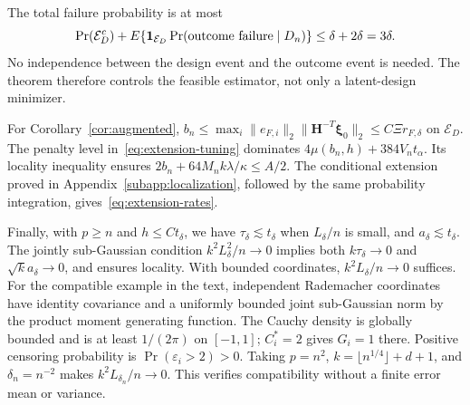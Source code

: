 The total failure probability is at most
\[
 \Pr(\mathcal E_D^c)
    +E\{\mathbf1_{\mathcal E_D}\Pr(\text{outcome failure}\mid\mathcal \bm{D}_n)\}
 \le\delta+2\delta=3\delta.
\]
No independence between the design event and the outcome event is needed. The theorem therefore controls the feasible estimator, not only a latent-design minimizer.

For Corollary~\ref{cor:augmented}, $b_n\le\max_i\|e_{F,i}\|_2\|\bm{H}^{-T}\bm{\xi}_0\|_2\le C\Xi r_{F,\delta}$ on $\mathcal E_D$. The penalty level in~\eqref{eq:extension-tuning} dominates $4\mu(b_n,h)+384V_nt_\alpha$. Its locality inequality ensures $2b_n+64M_nk\lambda/\kappa\le A/2$. The conditional extension proved in Appendix~\ref{subapp:localization}, followed by the same probability integration, gives~\eqref{eq:extension-rates}.

Finally, with $p\ge n$ and $h\le Ct_\delta$, we have $\tau_\delta\lesssim t_\delta$ when $L_\delta/n$ is small, and $a_\delta\lesssim t_\delta$. The jointly sub-Gaussian condition $k^2L_\delta^2/n\to0$ implies both $k\tau_\delta\to0$ and $\sqrt{k}a_\delta\to0$, and ensures locality. With bounded coordinates, $k^2L_\delta/n\to0$ suffices. For the compatible example in the text, independent Rademacher coordinates have identity covariance and a uniformly bounded joint sub-Gaussian norm by the product moment generating function. The Cauchy density is globally bounded and is at least $1/(2\pi)$ on $[-1,1]$; $C_i^*=2$ gives $G_i=1$ there. Positive censoring probability is $\Pr(\varepsilon_i>2)>0$. Taking $p=n^2$, $k=\lfloor n^{1/4}\rfloor+d+1$, and $\delta_n=n^{-2}$ makes $k^2L_{\delta_n}/n\to0$. This verifies compatibility without a finite error mean or variance.
